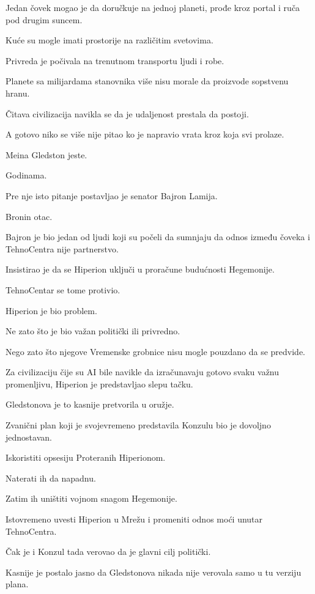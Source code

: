 Jedan čovek mogao je da doručkuje na jednoj planeti, prođe kroz portal i ruča pod drugim suncem.

Kuće su mogle imati prostorije na različitim svetovima.

Privreda je počivala na trenutnom transportu ljudi i robe.

Planete sa milijardama stanovnika više nisu morale da proizvode sopstvenu hranu.

Čitava civilizacija navikla se da je udaljenost prestala da postoji.

A gotovo niko se više nije pitao ko je napravio vrata kroz koja svi prolaze.

\bigskip

Meina Gledston jeste.

Godinama.

Pre nje isto pitanje postavljao je senator Bajron Lamija.

Bronin otac.

Bajron je bio jedan od ljudi koji su počeli da sumnjaju da odnos između čoveka i TehnoCentra nije partnerstvo.

Insistirao je da se Hiperion uključi u proračune budućnosti Hegemonije.

TehnoCentar se tome protivio.

Hiperion je bio problem.

Ne zato što je bio važan politički ili privredno.

Nego zato što njegove Vremenske grobnice nisu mogle pouzdano da se predvide.

Za civilizaciju čije su AI bile navikle da izračunavaju gotovo svaku važnu promenljivu, Hiperion je predstavljao slepu tačku.

Gledstonova je to kasnije pretvorila u oružje.

\bigskip

Zvanični plan koji je svojevremeno predstavila Konzulu bio je dovoljno jednostavan.

Iskoristiti opsesiju Proteranih Hiperionom.

Naterati ih da napadnu.

Zatim ih uništiti vojnom snagom Hegemonije.

Istovremeno uvesti Hiperion u Mrežu i promeniti odnos moći unutar TehnoCentra.

Čak je i Konzul tada verovao da je glavni cilj politički.

Kasnije je postalo jasno da Gledstonova nikada nije verovala samo u tu verziju plana.

